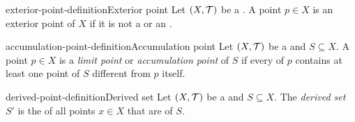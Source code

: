 \documentclass[preview]{standalone}
\begin{document}

\begin{snippetdefinition}{exterior-point-definition}{Exterior point}
    Let \({(X, \mathcal{T})}\) be a \topologicalspace.
    A point \(p \in X\) is an exterior point of \(X\) if it is not a \boundarypoint
    or an \interiorpoint.
\end{snippetdefinition}

\begin{snippetdefinition}{accumulation-point-definition}{Accumulation point}
    Let \({(X, \mathcal{T})}\) be a \topologicalspace and \(S \subseteq X\).
    A point \(p \in X\) is a \emph{limit point} or \emph{accumulation point} of \(S\)
    if every \neighborhood of \(p\) contains at least one point of \(S\) different from \(p\) itself.
\end{snippetdefinition}

\begin{snippetdefinition}{derived-point-definition}{Derived set}
    Let \({(X, \mathcal{T})}\) be a \topologicalspace and \(S \subseteq X\).
    The \emph{derived set} \(S'\) is the \set of all points \(x\in X\) that are
     of \(S\).
\end{snippetdefinition}
\end{document}
